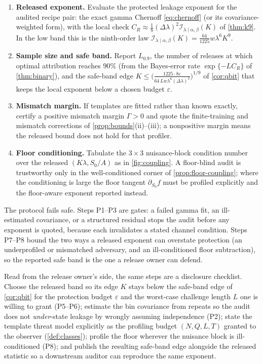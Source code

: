 \documentclass[11pt]{article}
\newcommand{\eps}{\varepsilon}
\newcommand{\calI}{\mathcal I}
\begin{document}
\begin{enumerate}[label=\textbf{P\arabic*.}]
\item \textbf{Released exponent.} Evaluate the protected leakage exponent for the audited recipe pair: the exact gamma Chernoff \eqref{eq:chernoff} (or its covariance-weighted form), with the local check \(C_R\approx\tfrac18(\Delta\lambda)^2\calI_{\lambda\mid\alpha,\beta}(K)\) of \cref{thm:k9}. In the low band this is the ninth-order law \(\calI_{\lambda\mid\alpha,\beta}(K)=\tfrac{64}{1225}w\lambda^6K^9\).
\item \textbf{Sample size and safe band.} Report \(L_{0.9}\), the number of releases at which optimal attribution reaches \(90\%\) (from the Bayes-error rate \(\exp\{-LC_R\}\) of \cref{thm:binary}), and the safe-band edge \(K\le\big(\tfrac{1225\cdot 8\eps}{64\,Lw\lambda^6(\Delta\lambda)^2}\big)^{1/9}\) of \cref{cor:qbit} that keeps the local exponent below a chosen budget \(\eps\).
\item \textbf{Mismatch margin.} If templates are fitted rather than known exactly, certify a positive mismatch margin \(\Gamma>0\) and quote the finite-training and mismatch corrections of \cref{prop:bounds}(ii)--(iii); a nonpositive margin means the released bound does not hold for that profiler.
\item \textbf{Floor conditioning.} Tabulate the \(3\times3\) nuisance-block condition number over the released \((K\lambda,S_0/A)\) as in \cref{fig:coupling}. A floor-blind audit is trustworthy only in the well-conditioned corner of \cref{prop:floor-coupling}; where the conditioning is large the floor tangent \(\partial_{S_0}f\) must be profiled explicitly and the floor-aware exponent reported instead.
\end{enumerate}

The protocol fails safe. Steps P1--P3 are gates: a failed gamma fit, an ill-estimated covariance, or a structured residual stops the audit before any exponent is quoted, because each invalidates a stated channel condition. Steps P7--P8 bound the two ways a released exponent can overstate protection (an underprofiled or mismatched adversary, and an ill-conditioned floor subtraction), so the reported safe band is the one a release owner can defend.

Read from the release owner's side, the same steps are a disclosure checklist. Choose the released band so its edge \(K\) stays below the safe-band edge of \cref{cor:qbit} for the protection budget \(\eps\) and the worst-case challenge length \(L\) one is willing to grant (P5--P6); estimate the bin covariance from repeats so the audit does not \emph{under}-state leakage by wrongly assuming independence (P2); state the template threat model explicitly as the profiling budget \((N,Q,L,T)\) granted to the observer (\cref{def:classes}); profile the floor wherever the nuisance block is ill-conditioned (P8); and publish the resulting safe-band edge alongside the released statistic so a downstream auditor can reproduce the same exponent.
\end{document}
